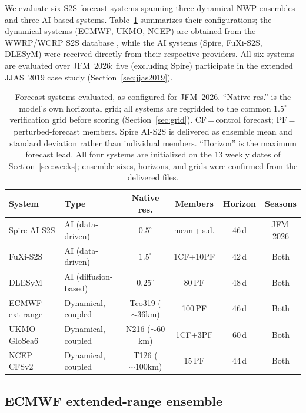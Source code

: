 \documentclass[11pt,a4paper]{article}
\begin{document}
We evaluate six S2S forecast systems spanning three dynamical NWP ensembles and three
AI-based systems. Table~\ref{tab:models} summarizes their configurations; the dynamical
systems (ECMWF, UKMO, NCEP) are obtained from the WWRP/WCRP S2S database
\citep{vitart2017}, while the AI systems (Spire, FuXi-S2S, DLESyM) were received
directly from their respective providers. All six systems are evaluated over JFM~2026;
five (excluding Spire) participate in the extended JJAS~2019 case study
(Section~\ref{sec:jjas2019}).

\begin{table}[t]
  \caption{Forecast systems evaluated, as configured for JFM~2026.
  ``Native res.'' is the model's own horizontal grid; all systems are
  regridded to the common $1.5^{\circ}$ verification grid before scoring
  (Section~\ref{sec:grid}). CF\,=\,control forecast; PF\,=\,perturbed-forecast
  members. Spire AI-S2S is delivered as ensemble mean and standard deviation
  rather than individual members. ``Horizon'' is the maximum forecast lead.
  All four systems are initialized on the 13 weekly dates of
  Section~\ref{sec:weeks}; ensemble sizes, horizons, and grids were confirmed
  from the delivered files.}
  \label{tab:models}
  \centering
  \footnotesize
  \setlength{\tabcolsep}{5pt}
  \begin{tabular}{llcccc}
    \toprule
    System & Type & Native res. & Members & Horizon & Seasons \\
    \midrule
    Spire AI-S2S    & AI (data-driven)       & $0.5^{\circ}$         & mean\,+\,s.d.      & 46\,d & JFM\,2026 \\
    FuXi-S2S        & AI (data-driven)       & $1.5^{\circ}$         & 1CF+10PF            & 42\,d & Both \\
    DLESyM          & AI (diffusion-based)   & $0.25^{\circ}$        & 80\,PF              & 48\,d & Both \\
    ECMWF ext-range & Dynamical, coupled     & Tco319 (${\sim}36$km) & 100\,PF             & 46\,d & Both \\
    UKMO GloSea6    & Dynamical, coupled     & N216 (${\sim}60$km)   & 1CF+3PF             & 60\,d & Both \\
    NCEP CFSv2      & Dynamical, coupled     & T126 (${\sim}100$km)  & 15\,PF              & 44\,d & Both \\
    \bottomrule
  \end{tabular}
\end{table}

\subsection{ECMWF extended-range ensemble}\label{sec:ecmwf}
\end{document}
